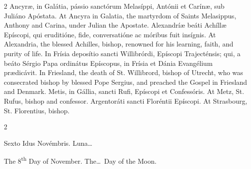 \begin{paracol}{2}
\switchcolumn*
{}
Ancyræ, in Galátia, pássio sanctórum Melasíppi, Antónii et Carínæ, sub Juliáno Apóstata.
\switchcolumn
{}
At Ancyra in Galatia, the martyrdom 
 of Saints Melasippus, Anthony and Carina, under Julian the Apostate.
\switchcolumn*
{}
Alexandríæ beáti 
 Achíllæ Epíscopi, qui eruditióne, fide, conversatióne ac móribus fuit 
 insígnis.
\switchcolumn
{}
At Alexandria, the blessed Achilles, 
 bishop, renowned for his learning, faith, and purity of life.
\switchcolumn*
{}
In Frísia deposítio 
 sancti Willibrórdi, Epíscopi Trajecténsis; qui, a beáto Sérgio Papa ordinátus Epíscopus, in Frísia et Dánia Evangélium prædicávit.
\switchcolumn
{}
In Friesland, the death of St. 
 Willibrord, bishop of Utrecht, who was consecrated bishop by blessed Pope 
 Sergius, and preached the Gospel in Friesland and Denmark.
\switchcolumn*
{}
Metis, in Gállia, 
 sancti Rufi, Epíscopi et Confessóris.
\switchcolumn
{}
At Metz, St. Rufus, bishop and 
 confessor.
\switchcolumn*
{}
Argentoráti sancti 
 Floréntii Epíscopi.
\switchcolumn
{}
At Strasbourg, St. Florentius, 
 bishop.
\switchcolumn*
{}
\end{paracol}


\begin{paracol}{2}
\begin{center}{\color{gregoriocolor} Sexto Idus Novémbris. 
 Luna\dots\ }\end{center}
\switchcolumn
{}
\begin{center}{\color{gregoriocolor} The 8\textsuperscript{th} Day of 
 November. The\dots\ Day of the Moon.}\end{center}
\end{paracol}

